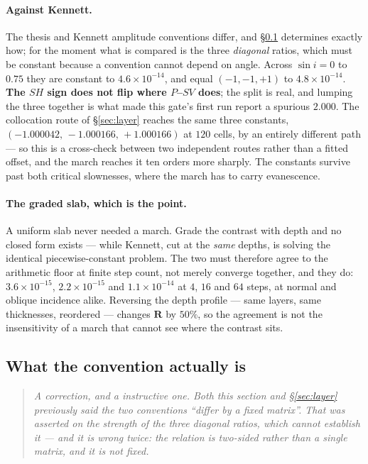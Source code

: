 \documentclass[11pt,a4paper]{article}
\newcommand{\bR}{\mathbf{R}}
\begin{document}
\paragraph{Against Kennett.}  The thesis and Kennett amplitude conventions
differ, and \S\ref{sec:whatconvention} determines exactly how; for the moment
what is compared is the three \emph{diagonal} ratios, which must be constant
because a convention cannot depend on angle.  Across $\sin i = 0$ to $0.75$ they
are constant to $4.6\times10^{-14}$, and equal
$(-1,-1,+1)$ to $4.8\times10^{-14}$.  \textbf{The $SH$ sign does not flip where
$P$--$SV$ does}; the split is real, and lumping the three together is what made
this gate's first run report a spurious $2.000$.  The collocation route of
\S\ref{sec:layer} reaches the same three constants, $(-1.000042,\,-1.000166,\,
+1.000166)$ at $120$ cells, by an entirely different path --- so this is a
cross-check between two independent routes rather than a fitted offset, and the
march reaches it ten orders more sharply.  The constants survive past both
critical slownesses, where the march has to carry evanescence.

\paragraph{The graded slab, which is the point.}  A uniform slab never needed a
march.  Grade the contrast with depth and no closed form exists --- while
Kennett, cut at the \emph{same} depths, is solving the identical
piecewise-constant problem.  The two must therefore agree to the arithmetic
floor at finite step count, not merely converge together, and they do:
$3.6\times10^{-15}$, $2.2\times10^{-15}$ and $1.1\times10^{-14}$ at $4$, $16$
and $64$ steps, at normal and oblique incidence alike.  Reversing the depth
profile --- same layers, same thicknesses, reordered --- changes $\bR$ by
$50\%$, so the agreement is not the insensitivity of a march that cannot see
where the contrast sits.

\subsection{What the convention actually is}\label{sec:whatconvention}

\begin{quote}
\small\itshape
A correction, and a instructive one.  Both this section and \S\ref{sec:layer}
previously said the two conventions ``differ by a fixed matrix''.  That was
asserted on the strength of the three \emph{diagonal} ratios, which cannot
establish it --- and it is wrong twice: the relation is two-sided rather than a
single matrix, and it is not fixed.
\end{quote}
\end{document}
